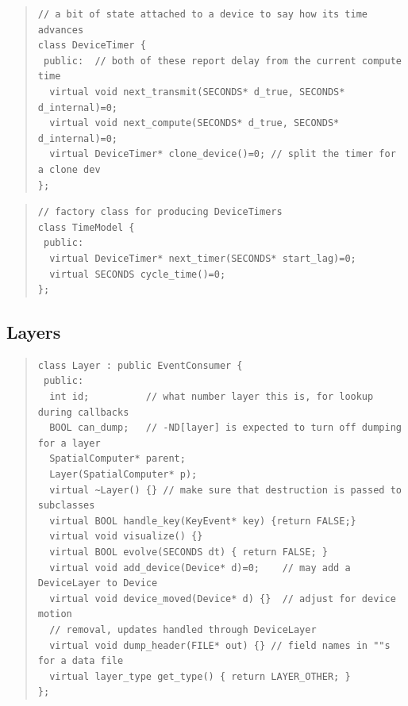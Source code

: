 \documentclass{article}
\begin{document}
\begin{quote}
\begin{verbatim}
// a bit of state attached to a device to say how its time advances
class DeviceTimer {
 public:  // both of these report delay from the current compute time
  virtual void next_transmit(SECONDS* d_true, SECONDS* d_internal)=0;
  virtual void next_compute(SECONDS* d_true, SECONDS* d_internal)=0;
  virtual DeviceTimer* clone_device()=0; // split the timer for a clone dev
};
\end{verbatim}
\end{quote}

\begin{quote}
\begin{verbatim}
// factory class for producing DeviceTimers
class TimeModel {
 public:
  virtual DeviceTimer* next_timer(SECONDS* start_lag)=0;
  virtual SECONDS cycle_time()=0;
};
\end{verbatim}
\end{quote}

\subsection{Layers}

\begin{quote}
\begin{verbatim}
class Layer : public EventConsumer {
 public:
  int id;          // what number layer this is, for lookup during callbacks                    
  BOOL can_dump;   // -ND[layer] is expected to turn off dumping for a layer                    
  SpatialComputer* parent;
  Layer(SpatialComputer* p);
  virtual ~Layer() {} // make sure that destruction is passed to subclasses                     
  virtual BOOL handle_key(KeyEvent* key) {return FALSE;}
  virtual void visualize() {}
  virtual BOOL evolve(SECONDS dt) { return FALSE; }
  virtual void add_device(Device* d)=0;    // may add a DeviceLayer to Device                   
  virtual void device_moved(Device* d) {}  // adjust for device motion                          
  // removal, updates handled through DeviceLayer                                               
  virtual void dump_header(FILE* out) {} // field names in ""s for a data file                  
  virtual layer_type get_type() { return LAYER_OTHER; }
};
\end{verbatim}
\end{quote}
\end{document}
